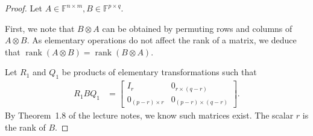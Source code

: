 \documentclass[11pt]{article}
\DeclareMathOperator{\rank}{rank}
\newcommand{\field}{\mathbb{F}} %
\newcommand{\kp}{\otimes} %
\begin{document}
\begin{proof}
Let \(A \in \field^{n\times m}, B \in \field^{p\times q}\).

First, we note that $B\kp A$ can be obtained by permuting rows and columns of $A\kp B$.
As elementary operations do not affect the rank of a matrix, we deduce that $\rank(A\kp B) = \rank(B\kp A)$.

Let $R_1$ and $Q_1$ be products of elementary transformations such that
\begin{align*}
    R_1BQ_1 &=\begin{bmatrix}
    I_r & 0_{r\times(q-r)}\\
    0_{(p-r)\times r} & 0_{(p-r)\times (q-r)}
    \end{bmatrix}.
\end{align*}
By Theorem~1.8 of the lecture notes, we know such matrices exist.
The scalar $r$ is the rank of \(B\).


\end{proof}
\end{document}
